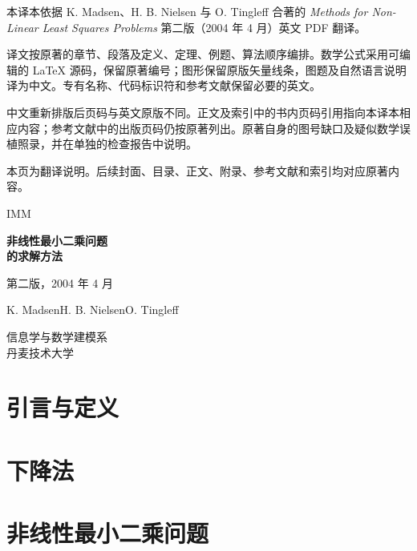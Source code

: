 \documentclass[UTF8,11pt,openany,oneside,a4paper,fontset=none]{ctexbook}
\begin{document}
\frontmatter
{}
\hypersetup{pageanchor=false}
\thispagestyle{empty}
\begin{center}\vspace*{22mm}{\LARGE\bfseries 翻译说明}\end{center}
\vspace{12mm}
本译本依据 K. Madsen、H. B. Nielsen 与 O. Tingleff 合著的
\textit{Methods for Non-Linear Least Squares Problems} 第二版（2004 年 4 月）英文 PDF 翻译。
\par
译文按原著的章节、段落及定义、定理、例题、算法顺序编排。数学公式采用可编辑的 LaTeX 源码，保留原著编号；图形保留原版矢量线条，图题及自然语言说明译为中文。专有名称、代码标识符和参考文献保留必要的英文。
\par
中文重新排版后页码与英文原版不同。正文及索引中的书内页码引用指向本译本相应内容；参考文献中的出版页码仍按原著列出。原著自身的图号缺口及疑似数学误植照录，并在单独的检查报告中说明。
\par
本页为翻译说明。后续封面、目录、正文、附录、参考文献和索引均对应原著内容。
\clearpage
\begin{titlepage}
\centering
{\large IMM\par}
\vspace*{35mm}
{\Huge\bfseries 非线性最小二乘问题\\[8mm]的求解方法\par}
\vspace{15mm}
{\Large 第二版，2004 年 4 月\par}
\vspace{24mm}
{\large K. Madsen\quad H. B. Nielsen\quad O. Tingleff\par}
\vfill
{\large 信息学与数学建模系\\[3mm]丹麦技术大学\par}
\vspace{20mm}
\end{titlepage}
\hypersetup{pageanchor=true}
\tableofcontents
\mainmatter
\chapter{引言与定义}

\chapter{下降法}

\chapter{非线性最小二乘问题}





\end{document}

